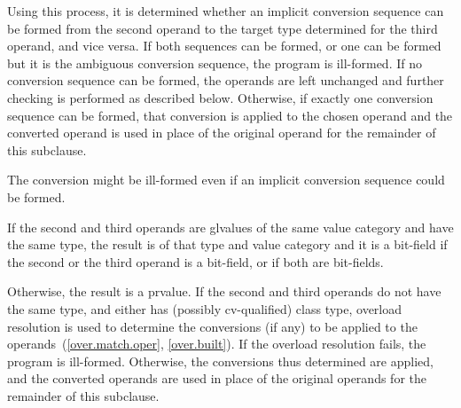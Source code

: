 Using this process, it is determined whether an implicit conversion
sequence can be formed from the second operand
to the target type determined for the third operand, and vice versa.
If both sequences can be formed, or one can be formed but it is the
ambiguous conversion sequence, the program is ill-formed.
If no conversion sequence can be formed, the operands are left unchanged
and further checking is performed as described below.
Otherwise, if exactly one conversion sequence can be formed,
that conversion is applied to the chosen operand
and the converted operand is used in place of the original operand for
the remainder of this subclause.
\begin{note}
The conversion might be ill-formed even if an implicit conversion
sequence could be formed.
\end{note}

\pnum
If the second and third operands are glvalues of the same value category
and have the same type, the
result is of that type and value category and it is a bit-field if the
second or the third operand is a bit-field, or if both are bit-fields.

\pnum
Otherwise, the result is a prvalue. If the second and third operands do
not have the same type, and either has (possibly cv-qualified) class
type, overload resolution is used to determine the conversions (if any)
to be applied to the operands~(\ref{over.match.oper}, \ref{over.built}).
If the overload resolution fails, the program is ill-formed. Otherwise,
the conversions thus determined are applied, and the converted operands
are used in place of the original operands for the remainder of this
subclause.

